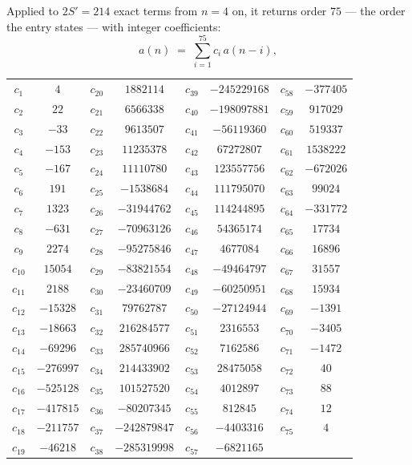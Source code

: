 \documentclass[11pt,a4paper]{article}
\theoremstyle{plain}
\theoremstyle{definition}
\begin{document}
Applied to $2S'=214$ exact terms from $n=4$ on, it returns order $75$ --- the
order the entry states --- with integer coefficients:
\[
a(n)\;=\;\sum_{i=1}^{75}c_i\,a(n-i),
\]
\begin{center}\small
\begin{tabular}{cccccccc}
$c_{1}$ & $4$ & $c_{20}$ & $1882114$ & $c_{39}$ & $-245229168$ & $c_{58}$ & $-377405$ \\
$c_{2}$ & $22$ & $c_{21}$ & $6566338$ & $c_{40}$ & $-198097881$ & $c_{59}$ & $917029$ \\
$c_{3}$ & $-33$ & $c_{22}$ & $9613507$ & $c_{41}$ & $-56119360$ & $c_{60}$ & $519337$ \\
$c_{4}$ & $-153$ & $c_{23}$ & $11235378$ & $c_{42}$ & $67272807$ & $c_{61}$ & $1538222$ \\
$c_{5}$ & $-167$ & $c_{24}$ & $11110780$ & $c_{43}$ & $123557756$ & $c_{62}$ & $-672026$ \\
$c_{6}$ & $191$ & $c_{25}$ & $-1538684$ & $c_{44}$ & $111795070$ & $c_{63}$ & $99024$ \\
$c_{7}$ & $1323$ & $c_{26}$ & $-31944762$ & $c_{45}$ & $114244895$ & $c_{64}$ & $-331772$ \\
$c_{8}$ & $-631$ & $c_{27}$ & $-70963126$ & $c_{46}$ & $54365174$ & $c_{65}$ & $17734$ \\
$c_{9}$ & $2274$ & $c_{28}$ & $-95275846$ & $c_{47}$ & $4677084$ & $c_{66}$ & $16896$ \\
$c_{10}$ & $15054$ & $c_{29}$ & $-83821554$ & $c_{48}$ & $-49464797$ & $c_{67}$ & $31557$ \\
$c_{11}$ & $2188$ & $c_{30}$ & $-23460709$ & $c_{49}$ & $-60250951$ & $c_{68}$ & $15934$ \\
$c_{12}$ & $-15328$ & $c_{31}$ & $79762787$ & $c_{50}$ & $-27124944$ & $c_{69}$ & $-1391$ \\
$c_{13}$ & $-18663$ & $c_{32}$ & $216284577$ & $c_{51}$ & $2316553$ & $c_{70}$ & $-3405$ \\
$c_{14}$ & $-69296$ & $c_{33}$ & $285740966$ & $c_{52}$ & $7162586$ & $c_{71}$ & $-1472$ \\
$c_{15}$ & $-276997$ & $c_{34}$ & $214433902$ & $c_{53}$ & $28475058$ & $c_{72}$ & $40$ \\
$c_{16}$ & $-525128$ & $c_{35}$ & $101527520$ & $c_{54}$ & $4012897$ & $c_{73}$ & $88$ \\
$c_{17}$ & $-417815$ & $c_{36}$ & $-80207345$ & $c_{55}$ & $812845$ & $c_{74}$ & $12$ \\
$c_{18}$ & $-211757$ & $c_{37}$ & $-242879847$ & $c_{56}$ & $-4403316$ & $c_{75}$ & $4$ \\
$c_{19}$ & $-46218$ & $c_{38}$ & $-285319998$ & $c_{57}$ & $-6821165$ &  &  \\
\end{tabular}
\end{center}
\end{document}
